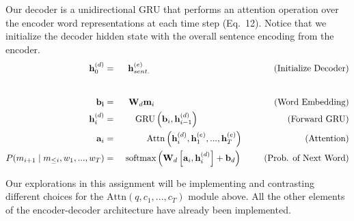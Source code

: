 \documentclass[a4paper,10pt]{article}
\begin{document}
\newpage
{} Our decoder is a unidirectional GRU that performs an attention operation over the encoder word representations at each time step (Eq.~12). Notice that we initialize the decoder hidden state with the overall sentence encoding from the encoder.
\begin{eqnarray}
\mathbf{h}_0^{(d)} &=& \mathbf{h}_{sent.}^{(e)}\mbox{\hspace{140pt}(Initialize Decoder)}\\
 \nonumber\\[8pt]
\mathbf{b_i} &=& \mathbf{W}_d\mathbf{m}_{i} \mbox{\hspace{135pt}(Word Embedding)}\\
{\mathbf{h}}_i^{(d)} &=& {\mbox{GRU}}\left(\textbf{b}_i, {\mathbf{h}}_{i-1}^{(d)}\right) \mbox{\hspace{100pt}(Forward GRU)}\\
\mathbf{a}_i &=& \mbox{Attn}\left(\mathbf{h}_i^{(d)}, \mathbf{h}_1^{(e)}, ... , \mathbf{h}_T^{(e)}\right) \mbox{\hspace{70pt}(Attention)}\\ 
P(m_{i+1} \mid m_{\leq i}, w_1, ... , w_T) &=& \mbox{ softmax}\left(\mathbf{W}_d\left[\mathbf{a}_i, \mathbf{h}_i^{(d)}\right] + \mathbf{b}_d\right) \mbox{\hspace{25pt}(Prob. of Next Word)}
\end{eqnarray}

\noindent Our explorations in this assignment will be implementing and contrasting different choices for the $\mbox{Attn}(q, c_1, ..., c_T)$ module above. All the other elements of the encoder-decoder architecture have already been implemented. 
\end{document}
